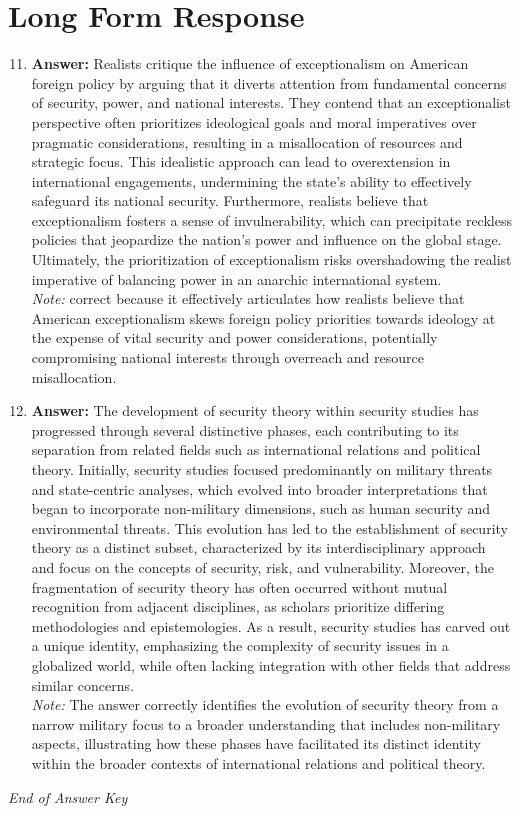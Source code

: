 \documentclass[12pt]{article}
\begin{document}
\section*{Long Form Response}
\begin{enumerate}[label=\arabic*.]
\setcounter{enumi}{10}
\item \textbf{Answer:} Realists critique the influence of exceptionalism on American foreign policy by arguing that it diverts attention from fundamental concerns of security, power, and national interests. They contend that an exceptionalist perspective often prioritizes ideological goals and moral imperatives over pragmatic considerations, resulting in a misallocation of resources and strategic focus. This idealistic approach can lead to overextension in international engagements, undermining the state's ability to effectively safeguard its national security. Furthermore, realists believe that exceptionalism fosters a sense of invulnerability, which can precipitate reckless policies that jeopardize the nation's power and influence on the global stage. Ultimately, the prioritization of exceptionalism risks overshadowing the realist imperative of balancing power in an anarchic international system.
\\ \textit{Note:} correct because it effectively articulates how realists believe that American exceptionalism skews foreign policy priorities towards ideology at the expense of vital security and power considerations, potentially compromising national interests through overreach and resource misallocation.
\item \textbf{Answer:} The development of security theory within security studies has progressed through several distinctive phases, each contributing to its separation from related fields such as international relations and political theory. Initially, security studies focused predominantly on military threats and state-centric analyses, which evolved into broader interpretations that began to incorporate non-military dimensions, such as human security and environmental threats. This evolution has led to the establishment of security theory as a distinct subset, characterized by its interdisciplinary approach and focus on the concepts of security, risk, and vulnerability. Moreover, the fragmentation of security theory has often occurred without mutual recognition from adjacent disciplines, as scholars prioritize differing methodologies and epistemologies. As a result, security studies has carved out a unique identity, emphasizing the complexity of security issues in a globalized world, while often lacking integration with other fields that address similar concerns.
\\ \textit{Note:} The answer correctly identifies the evolution of security theory from a narrow military focus to a broader understanding that includes non-military aspects, illustrating how these phases have facilitated its distinct identity within the broader contexts of international relations and political theory.
\end{enumerate}

\vfill
\noindent\textit{End of Answer Key}
\end{document}
